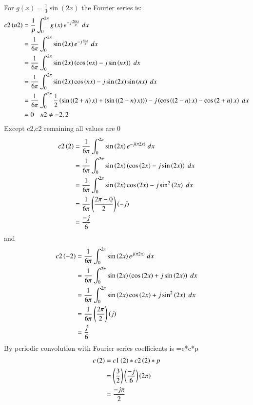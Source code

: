 \documentclass[journal,12pt,onecolumn]{IEEEtran}
\theoremstyle{remark}
\begin{document}
 For $ g(x) = \frac{1}{3}\sin(2x) $ the Fourier series is:
 \begin{align}
    c2\left(n2\right)&=\frac{1}{p}\int_{0}^{2\pi}g\left(x\right)e^{-j\frac{2\pi n x}{p}}\;dx \\
    &=\frac{1}{6\pi}\int_{0}^{2\pi}\sin\left(2x\right)e^{-j\frac{\pi n x}{\pi}}\;dx \\
    &=\frac{1}{6\pi}\int_{0}^{2\pi}\sin\left(2x\right)\left(\cos\left(nx\right)-j\sin\left(nx\right)\right)\;dx \\
    &=\frac{1}{6\pi}\int_{0}^{2\pi}\sin\left(2x\right)\cos\left(nx\right)-j\sin\left(2x\right)\sin\left(nx\right)\;dx \\
    &=\frac{1}{6\pi}\int_{0}^{2\pi}\frac{1}{2}\left(\sin\left(\left(2+n\right)x\right)+\left(\sin\left(\left(2-n\right)x\right)\right)\right)-j\left(\cos\left(\left(2-n\right)x\right)-\cos\left(2+n\right)x\right)\;dx \\
    &=0 \quad{n2\neq-2,2}
\end{align}
Except c2,c2 remaining all values are 0
\begin{align}
    c2\left(2\right)&=\frac{1}{6\pi}\int_{0}^{2\pi}\sin\left(2x\right)e^{-j\left(\pi 2 x\right)}\;dx \\
    &=\frac{1}{6\pi}\int_{0}^{2\pi}\sin\left(2x\right)\left(\cos\left(2x\right)-j\sin\left(2x\right)\right)\;dx \\
    &=\frac{1}{6\pi}\int_{0}^{2\pi}\sin\left(2x\right)\cos\left(2x\right)-j\sin^2\left(2x\right)\;dx \\
    &=\frac{1}{6\pi}\left(\frac{2\pi-0}{2}\right)\left(-j\right)\\
    &=\frac{-j}{6}\\
\end{align}
and
\begin{align}
    c2\left(-2\right)&=\frac{1}{6\pi}\int_{0}^{2\pi}\sin\left(2x\right)e^{j\left(\pi 2 x\right)}\;dx \\
    &=\frac{1}{6\pi}\int_{0}^{2\pi}\sin\left(2x\right)\left(\cos\left(2x\right)+j\sin\left(2x\right)\right)\;dx \\
    &=\frac{1}{6\pi}\int_{0}^{2\pi}\sin\left(2x\right)\cos\left(2x\right)+j\sin^2\left(2x\right)\;dx \\
    &=\frac{1}{6\pi}\left(\frac{2\pi}{2}\right)\left(j\right)\\
    &=\frac{j}{6}
\end{align}
By periodic convolution with Fourier series coefficients is
=c*c*p\\
\begin{align}
    c\left(2\right)&=c1\left(2\right)*c2\left(2\right)*p\\
    &=\left(\frac{3}{2}\right)\left(\frac{-j}{6}\right)\left(2\pi\right)\\
    &=\frac{-j\pi}{2}
\end{align}
\end{document}
